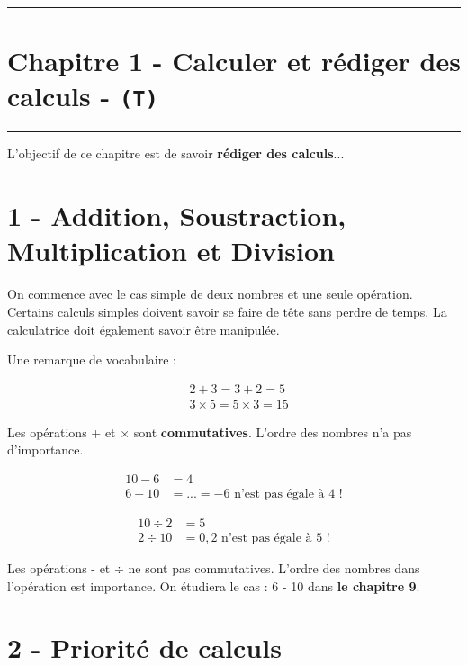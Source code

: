 \documentclass[11pt]{article}
\newcommand{\horrule}[1]{\rule{\linewidth}{#1}} %
\begin{document}
\setlength{\columnseprule}{1pt}

\horrule{2px}
\section*{Chapitre 1 - Calculer et rédiger des calculs - \texttt{(T)}}
\horrule{2px}

L'objectif de ce chapitre est de savoir \textbf{rédiger des calculs}...

\section*{1 - Addition, Soustraction, Multiplication et Division}

On commence avec le cas simple de deux nombres et une seule opération. Certains calculs simples doivent savoir se faire de tête sans perdre de temps. La calculatrice doit également savoir être manipulée.

Une remarque de vocabulaire :

\begin{align*}
& 2 + 3 = 3 + 2 = 5 \\
& 3 \times 5 = 5 \times 3 = 15
\end{align*}

\reversemarginpar\marginnote{$\Box \Box$}
Les opérations + et $\times$ sont \textbf{commutatives}. L'ordre des nombres n'a pas d'importance. 


\begin{minipage}[t]{0.5\textwidth}\begin{align*}
10 - 6 &= 4\\
6 - 10 &= ... = -6 \text{ n'est pas égale à 4 !}
\end{align*}\end{minipage}
\begin{minipage}[t]{0.5\textwidth}\begin{align*}
10 \div 2 &= 5\\
2 \div 10 &= 0,2 \text{ n'est pas égale à 5 !}
\end{align*}\end{minipage}

\reversemarginpar\marginnote{$\Box \Box$}
Les opérations - et $\div$ ne sont pas commutatives. L'ordre des nombres dans l'opération est importance. 
On étudiera le cas : 6 - 10 dans \textbf{le chapitre 9}.

\section*{2 - Priorité de calculs}
\end{document}
